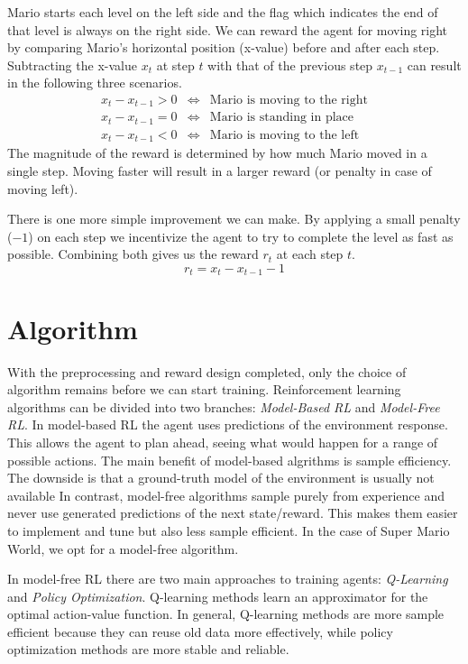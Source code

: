 \documentclass[a4paper]{article}
\begin{document}
Mario starts each level on the left side and the flag which indicates the end of that level is always on the right side.
We can reward the agent for moving right by comparing Mario's horizontal position (x-value) before and after each step.
Subtracting the x-value $x_{t}$ at step $t$ with that of the previous step $x_{t-1}$ can result in the following three scenarios.
\begin{eqnarray*}
    x_{t} - x_{t-1} > 0&\iff&\text{Mario is moving to the right}\\
    x_{t} - x_{t-1} = 0&\iff&\text{Mario is standing in place}\\
    x_{t} - x_{t-1} < 0&\iff&\text{Mario is moving to the left}
\end{eqnarray*}
The magnitude of the reward is determined by how much Mario moved in a single step.
Moving faster will result in a larger reward (or penalty in case of moving left).

There is one more simple improvement we can make.
By applying a small penalty ($-1$) on each step we incentivize the agent to try to complete the level as fast as possible.
Combining both gives us the reward $r_{t}$ at each step $t$.
\[r_{t} = x_{t} - x_{t-1} - 1\]


\section{Algorithm} \label{s:algorithm}
With the preprocessing and reward design completed, only the choice of algorithm remains before we can start training.
Reinforcement learning algorithms can be divided into two branches: \emph{Model-Based RL} and \emph{Model-Free RL}.
In model-based RL the agent uses predictions of the environment response.
This allows the agent to plan ahead, seeing what would happen for a range of possible actions.
The main benefit of model-based algrithms is sample efficiency.
The downside is that a ground-truth model of the environment is usually not available
In contrast, model-free algorithms sample purely from experience and never use generated predictions of the next state/reward.
This makes them easier to implement and tune but also less sample efficient.
In the case of Super Mario World, we opt for a model-free algorithm.

In model-free RL there are two main approaches to training agents: \emph{Q-Learning} and \emph{Policy Optimization}.
Q-learning methods learn an approximator for the optimal action-value function.
In general, Q-learning methods are more sample efficient because they can reuse old data more effectively, while policy optimization methods are more stable and reliable.
\end{document}
